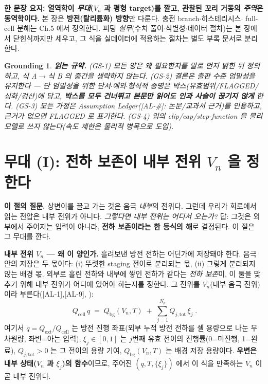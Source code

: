 \documentclass[11pt,a4paper]{article}
\newtheorem*{groundingbox}{Grounding}
\newcommand{\bg}{\mathrm{bg}}
\newcommand{\cell}{\mathrm{cell}}
\newcommand{\ext}{\mathrm{ext}}
\newcommand{\tot}{\mathrm{tot}}
\newcommand{\AL}[1]{\textsf{[AL-#1]}}
\begin{document}
\noindent\textbf{한 문장 요지: 열역학이 \emph{무대}($V_n$ 과 평형 target)를 깔고, 관찰된 꼬리 거동의
\emph{주역}은 동역학이다.} 본 장은 \textbf{방전(탈리튬화) 방향}만 다룬다. 충전 branch$\cdot$히스테리시스$\cdot$
full-cell 분해는 Ch.5 에서 정의한다. 피팅 \emph{실무}(수치 풀이$\cdot$식별성$\cdot$데이터 절차)는 본 장에서
닫힌식까지만 세우고, 그 식을 실데이터에 적용하는 절차는 별도 부록 문서로 분리한다.

\begin{groundingbox}
\textbf{읽는 규약.} (GS-1) 모든 양은 \emph{왜 필요한지}를 말로 먼저 밝힌 뒤 정의하고, 식 A$\to$식 B 의 중간을
생략하지 않는다. (GS-2) 결론은 출판 수준 엄밀성을 유지한다 — 단 엄밀성을 위한 단서$\cdot$예외$\cdot$형식적
증명은 \emph{박스}(유효범위/FLAGGED/심화/검산)에 담고, \textbf{박스를 모두 건너뛰고 본문만 읽어도 인과 사슬이
끊기지 않게} 한다. (GS-3) 모든 가정은 Assumption Ledger(\AL{\#}: 논문/교과서 근거)를 인용하고, 근거가
없으면 FLAGGED 로 표기한다. (GS-4) 임의 clip/cap/step-function 을 물리 모델로 쓰지 않는다(속도 제한은 물리적
병목으로 도입).
\end{groundingbox}

\tableofcontents
\newpage

\section{무대 (I): 전하 보존이 내부 전위 $V_n$ 을 정한다}\label{sec:charge}
\textbf{이 절의 질문.} 상변이를 끌고 가는 것은 음극 \emph{내부}의 전위다. 그런데 우리가 회로에서 읽는 전압은
내부 전위가 아니다. \emph{그렇다면 내부 전위는 어디서 오는가?} 답: 그것은 외부에서 주어지는 입력이 아니라,
\textbf{전하 보존이라는 한 등식의 해}로 결정된다. 이 절은 그 무대를 깐다.

\textbf{내부 전위 $V_n$ — 왜 이 양인가.} 흘려보낸 방전 전하는 어딘가에 저장돼야 한다. 음극 안의 저장은 두
몫이다: (i) 뚜렷한 staging 전이로 분리되는 몫, (ii) 그렇게 분리되지 않는 배경 몫. 외부로 흘린 전하와 내부에
쌓인 전하가 같다는 \emph{전하 보존}이, 이 둘을 맞추기 위해 내부 전위가 어디에 있어야 하는지를 정한다. 그
전위를 \textbf{$V_n$}(내부 음극 전위)이라 부른다(\AL{1},\AL{9}, \cite{doyle1993,newman}):
\begin{equation}
\boxed{\;Q_\cell\,q \;=\; Q_\bg(V_n,T) \;+\; \sum_{j=1}^{N_p} Q_{j,\tot}\,\xi_j\;.}
\label{eq:charge_balance}
\end{equation}
여기서 $q=Q_\ext/Q_\cell$ 는 방전 진행 좌표(외부 누적 방전 전하를 셀 용량으로 나눈 무차원량, 좌변=아는
입력), $\xi_j\in[0,1]$ 는 $j$번째 유효 전이의 진행률(0=미진행, 1=완료), $Q_{j,\tot}>0$ 는 그 전이의 용량
기여, $Q_\bg(V_n,T)$ 는 배경 저장 용량이다. \textbf{우변은 내부 상태($V_n$ 과 $\xi_j$)의 함수}이므로, 주어진
$(q,T,\{\xi_j\})$ 에서 이 식을 만족하는 $V_n$ 이 곧 내부 전위다.
\end{document}
